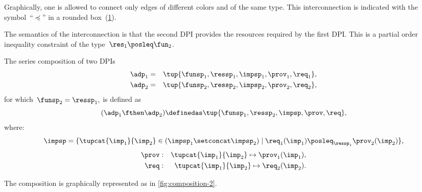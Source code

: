 Graphically, one is allowed to connect only edges of different colors and of the same type.
This interconnection is indicated with the symbol~``$\preceq$'' in a rounded box~(\cref{fig:connection}).

\begin{figure}[h]
  \centering
  \caption{\label{fig:connection}}
\end{figure}


The semantics of the interconnection is that the second DPI provides the resources required by the first DPI.
This is a partial order inequality constraint of the type~$\res_{1}\posleq\fun_{2}$.


\begin{definition}
  \label{def:series-composition}
  The series composition of two DPIs
  \begin{equation}
    \begin{aligned}
    \adp_{1}&=&\tup{\funsp_{1},\ressp_{1},\impsp_{1},\prov_{1},\req_{1}},
  \\
    \adp_{2}&=&\tup{\funsp_{2},\ressp_{2},\impsp_{2},\prov_{2},\req_{2}},
  \end{aligned}
  \end{equation}
  for which~$\funsp_{2}=\ressp_{1},$ is defined as
  \begin{equation}
    (\adp_{1} \fthen \adp_{2})
    \definedas
    \tup{ \funsp_{1},\ressp_{2},\impsp,\prov,\req},
  \end{equation}
  where:
  \begin{equation}
    \impsp  =  \{  \tupcat {\imp_{1}} {\imp_{2}} \in (\impsp_{1} \setconcat \impsp_{2})\mid\req_{1}(\imp_{1})\posleq_{\ressp_{1}}\prov_{2}(\imp_{2})\},
  \end{equation}
  \begin{equation}
  \begin{aligned}
    \prov & : & \tupcat {\imp_{1}} {\imp_{2}}   \mapsto\prov_{1}(\imp_{1}),\\
    \req & : & \tupcat {\imp_{1}} {\imp_{2}} \mapsto\req_{2}(\imp_{2}).
  \end{aligned}
  \end{equation}
\end{definition}

The composition is graphically represented as in \cref{fig:composition-2}.

